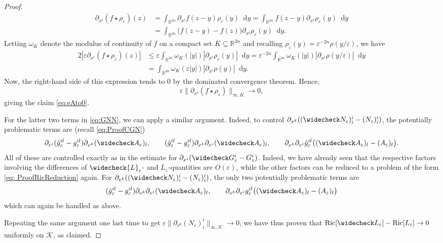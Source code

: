 \documentclass[a4paper,11pt]{article}
\numberwithin{equation}{section}
\theoremstyle{definition}
\theoremstyle{plain}
\newcommand{\R}{\mathbb R}
\newcommand{\eps}{\varepsilon}
\newcommand{\Ric}{\mathrm{Ric}}
\newcommand*\diff{\mathop{}\!\mathrm{d}}
\begin{document}
\begin{proof}
\begin{align*}
    \partial_{x^i}(f \star \rho_\eps)(z) 
    &=\int_{\R^{2n}} \partial_{x^i}f(z-y)\rho_\eps(y)\diff y
    =\int_{\R^{2n}} f(z-y)\partial_{x^i}\rho_\eps(y)\diff y \\ 
    &=\int_{\R^{2n}} \bigl(f(z-y)-f(z)\bigr)\partial_{x^i}\rho_\eps(y)\diff y.
\end{align*}
Letting $\omega_K$ denote the modulus of continuity of $f$ on a compact set $K \subseteq \R^{2n}$ and recalling $\rho_\eps(y)=\eps^{-2n}\rho(y/\eps)$, we have
\begin{alignat*}{2}
    |\eps\partial_{x^i} (f \star \rho_\eps)(z)|
    &\leq \eps \int_{\R^{2n}}\omega_K(|y|)|\partial_{x^i}\rho_\eps(y)|\diff y 
    =\eps^{-2n} \int_{\R^{2n}} \omega_K(|y|) |\partial_{x^i}\rho(y/\eps)| \diff y \\
    &= \int_{\R^{2n}}\omega_K(\eps|y|)|\partial_{x^i}\rho(y)| \diff y.
\end{alignat*}
Now, the right-hand side of this expression tends to $0$ by the dominated convergence theorem. 
Hence,
\begin{equation}
\label{eq:ConvergenceC0derivative}
    \eps\|\partial_{x^i}(f \star \rho_\eps)\|_{\infty,K}\rightarrow 0,
\end{equation}
giving the claim \eqref{eq:eAto0}. 

For the latter two terms in \eqref{eq:GNN}, we can apply a similar argument. 
Indeed, to control $\partial_{x^k} ((\widecheck N_\eps)^i_i - (N_\eps)^i_i)$, the potentially problematic terms are (recall \eqref{eq:ProofCGN})
\begin{equation*}
    \partial_{v^i}(\check g_\eps^{il} 
    - g_\eps^{il}) \partial_{x^k} (\widecheck A_\eps)_l, \qquad 
    (\check g_\eps^{il} - g_\eps^{il})\partial_{x^k}\partial_{v^i} (\widecheck A_\eps)_l, \qquad 
    \partial_{x^k}\partial_{v^i} \check g_\eps^{il}\bigl((\widecheck A_\eps)_l - (A_\eps)_l\bigr). 
\end{equation*}
All of these are controlled exactly as in the estimate for $\partial_{x^i}(\widecheck G^i_\eps-G^i_\eps)$.
Indeed, we have already seen that the respective factors involving the differences of $\widecheck{L}_\eps$- and $L_\eps$-quantities are $O(\eps)$, while the other factors can be reduced to a problem of the form \eqref{eq: ProofRicReduction} again. 
For $\partial_{v^k} ((\widecheck N_\eps)^i_i - (N_\eps)^i_i)$, the only two potentially problematic terms are
\begin{equation*}
    (\check g_\eps^{il}
    -g_\eps^{il})\partial_{v^k}\partial_{v^i} (\widecheck A_\eps)_l, \qquad \partial_{v^k} \partial_{v^i} g_\eps^{il}\bigl((\widecheck A_\eps)_l - (A_\eps)_l\bigr)
\end{equation*}
which can again be handled as above. 

Repeating the same argument one last time to get $\eps\|\partial_{v^k} (N_\eps)^i_i\|_{\infty,\mathcal{K}}\rightarrow 0$, we have thus proven that
$\Ric[\widecheck L_\eps] - \Ric[L_\eps] \rightarrow 0$
uniformly on $\mathcal{K}$, as claimed.
\end{proof}
\end{document}
